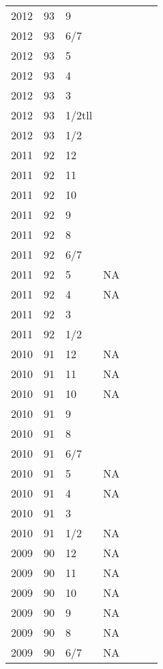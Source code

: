 \begin{longtable}{ |l|l|l|l|p{2.7cm}|l|p{2cm}| }
 2012 & 93 & 9     &         &  &  & \\
 2012 & 93 &   6/7 &         &  &  & \\
 2012 & 93 &     5 &         &  &  & \\
 2012 & 93 &     4 &         &  &  & \\
 2012 & 93 &     3 &         &  &  & \\
 2012 & 93 & 1/2tll&         &  &  & \\
 2012 & 93 &   1/2 &         &  &  & \\
 2011 & 92 &    12 &         &  &  & \\
 2011 & 92 &    11 &         &  &  & \\
 2011 & 92 &    10 &         &  &  & \\
 2011 & 92 &     9 &         &  &  & \\
 2011 & 92 &     8 &         &  &  & \\
 2011 & 92 &   6/7 &         &  &  & \\
 2011 & 92 &     5 &     NA  &  &  & \\
 2011 & 92 &     4 &     NA  &  &  & \\
 2011 & 92 &     3 &         &  &  & \\
 2011 & 92 &   1/2 &         &  &  & \\
 2010 & 91 &   12  &      NA &  &  & \\
 2010 & 91 &    11 &      NA &  &  & \\
 2010 & 91 &    10 &      NA &  &  & \\
 2010 & 91 &     9 &         &  &  & \\
 2010 & 91 &     8 &         &  &  & \\
 2010 & 91 &   6/7 &         &  &  & \\
 2010 & 91 &     5 &     NA  &  &  & \\
 2010 & 91 &     4 &     NA  &  &  & \\
 2010 & 91 &     3 &         &  &  & \\
 2010 & 91 &   1/2 &      NA &  &  & \\
 2009 & 90 &    12 &      NA &  &  & \\
 2009 & 90 &    11 &      NA &  &  & \\
 2009 & 90 &    10 &      NA &  &  & \\
 2009 & 90 &     9 &      NA &  &  & \\
 2009 & 90 &     8 &      NA &  &  & \\
 2009 & 90 &   6/7 &      NA &  &  & \\

\end{longtable}
